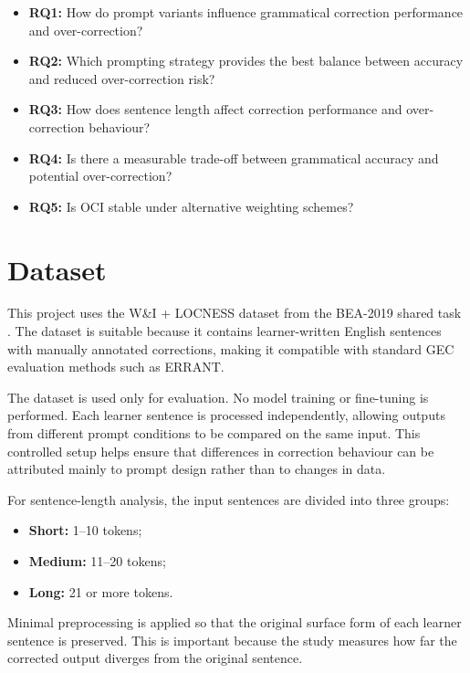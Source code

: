 \begin{itemize}
    \item \textbf{RQ1:} How do prompt variants influence grammatical correction performance and over-correction?
    \item \textbf{RQ2:} Which prompting strategy provides the best balance between accuracy and reduced over-correction risk?
    \item \textbf{RQ3:} How does sentence length affect correction performance and over-correction behaviour?
    \item \textbf{RQ4:} Is there a measurable trade-off between grammatical accuracy and potential over-correction?
    \item \textbf{RQ5:} Is OCI stable under alternative weighting schemes?
\end{itemize}

\section{Dataset}

This project uses the W\&I + LOCNESS dataset from the BEA-2019 shared task \cite{bryant-etal-2019-bea}. The dataset is suitable because it contains learner-written English sentences with manually annotated corrections, making it compatible with standard GEC evaluation methods such as ERRANT.

The dataset is used only for evaluation. No model training or fine-tuning is performed. Each learner sentence is processed independently, allowing outputs from different prompt conditions to be compared on the same input. This controlled setup helps ensure that differences in correction behaviour can be attributed mainly to prompt design rather than to changes in data.

For sentence-length analysis, the input sentences are divided into three groups:

\begin{itemize}
    \item \textbf{Short:} 1--10 tokens;
    \item \textbf{Medium:} 11--20 tokens;
    \item \textbf{Long:} 21 or more tokens.
\end{itemize}

Minimal preprocessing is applied so that the original surface form of each learner sentence is preserved. This is important because the study measures how far the corrected output diverges from the original sentence.

